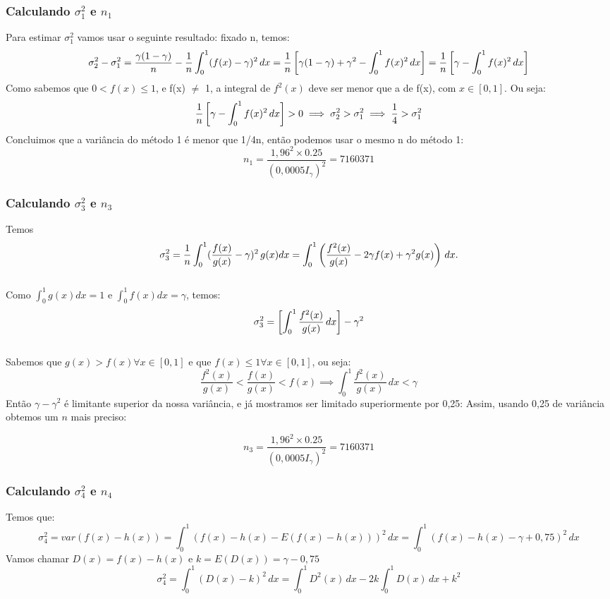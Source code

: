 \documentclass{article}
\begin{document}
\subsubsection{Calculando $\sigma^2_1$ e $n_1$}
Para estimar $\sigma^2_1$ vamos usar o seguinte resultado: fixado n, temos:
\[
\sigma^2_2 - \sigma^2_1 = \frac{\gamma(1 - \gamma)}{n} - \frac{1}{n} \int_{0}^{1} (f(x) - \gamma)^2 \,dx  = \frac{1}{n} \left[\gamma(1 - \gamma) + \gamma^2 - \int_{0}^{1} f(x)^2 \,dx\right] =  \frac{1}{n} \left[ \gamma -\int_{0}^{1} f(x)^2 \,dx \right]
\]
Como sabemos que $0<f(x)\leq 1$, e f(x) $\neq$ 1,  a integral de $f^2(x)$ deve ser menor que a de f(x), com $x \in [0,1]$. Ou seja:
\[
 \frac{1}{n} \left[ \gamma -\int_{0}^{1} f(x)^2 \,dx \right] > 0 \implies \sigma^2_2 > \sigma^2_1 \implies \frac{1}{4} > \sigma^2_1
\]
Concluimos que a variância do método 1 é menor que 1/4n, então podemos usar o mesmo n do método 1:
\[
n_1 =  \frac{1,96^2 \times 0.25}{(0,0005 I_\gamma)^2} = 7160371
\]

\subsubsection{Calculando $\sigma^2_3$ e $n_3$}
Temos 
\[
\sigma^2_3 = \frac{1}{n} \int_{0}^{1} (\frac{f(x)}{g(x)} - \gamma)^2 \,g(x)dx =  \int_{0}^{1}\left(\frac{f^2(x)}{g(x)} - 2\gamma f(x) + \gamma^2 g(x)\right)\,dx.
\] \\
Como $ \int_{0}^{1} g(x)dx = 1$ e $ \int_{0}^{1} f(x)dx = \gamma$, temos:
\[
\sigma^2_3 = \left[\int_{0}^{1} \frac{f^2(x)}{g(x)}\,dx\right] - \gamma^2
\] \\
Sabemos que $g(x)>f(x) \forall x \in [0,1]$ e que $f(x) \leq 1\forall x \in [0,1]$, ou seja:
\[
\frac{f^2(x)}{g(x)} < \frac{f(x)}{g(x)} < f(x) \implies \int_{0}^{1} \frac{f^2(x)}{g(x)}\,dx < \gamma
\]
Então $\gamma - \gamma^2$ é limitante superior da nossa variância, e já mostramos ser limitado superiormente por 0,25:
Assim, usando 0,25 de variância obtemos um $n$ mais preciso:

\[
n_3 =  \frac{1,96^2 \times 0.25}{(0,0005 I_\gamma)^2} = 7160371
\]

\subsubsection{Calculando $\sigma^2_4$ e $n_4$}
Temos que:
\[
\sigma^2_4 = var(f(x)-h(x)) = \int_{0}^{1}(f(x)-h(x) - E(f(x)-h(x)))^2 \,dx = \int_{0}^{1}(f(x)-h(x)-\gamma+0,75)^2 \,dx
\]
Vamos chamar $D(x)=f(x)-h(x)$ e $ k = E(D(x)) = \gamma - 0,75$ 
\[
\sigma^2_4 = \int_{0}^{1}(D(x)-k)^2 \,dx = \int_{0}^{1}D^2(x) \,dx -2k\int_{0}^{1} D(x) \,dx + k^2
\]
\end{document}

